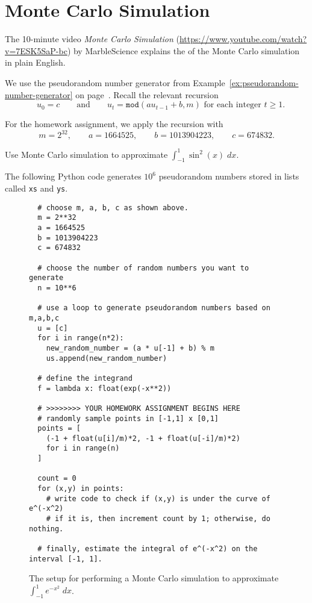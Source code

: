 \documentclass[../main.tex]{subfiles}
\begin{document}
 \section{Monte Carlo Simulation}\label{sec:probability-monte-carlo}

\faYoutube{} The 10-minute video \emph{Monte Carlo Simulation} (\url{https://www.youtube.com/watch?v=7ESK5SaP-bc}) by MarbleScience explains the  of the Monte Carlo simulation in plain English.

We use the pseudorandom number generator from Example~\ref{ex:pseudorandom-number-generator} on page~\pageref{ex:pseudorandom-number-generator}. Recall the relevant recursion 
\[
  \quad u_{0} = c \qquad\text{and}\qquad u_{t} = \mathtt{mod}(a u_{t-1} + b, m) \text{ for each integer } t \ge 1.
\]

For the homework assignment, we apply the recursion with
\[
  m = 2^{32}, \qquad a = 1664525, \qquad b = 1013904223, \qquad c = 674832.
\]

\begin{example}
  Use Monte Carlo simulation to approximate \(\int_{-1}^{1} \sin^{2}(x) \;dx\).
\end{example}

The following Python code generates \(10^{6}\) pseudorandom numbers stored in lists called \texttt{xs} and \texttt{ys}.

\begin{figure}[H]
  \begin{verbatim}
  # choose m, a, b, c as shown above.
  m = 2**32       
  a = 1664525     
  b = 1013904223  
  c = 674832

  # choose the number of random numbers you want to generate
  n = 10**6

  # use a loop to generate pseudorandom numbers based on m,a,b,c
  u = [c]         
  for i in range(n*2):
    new_random_number = (a * u[-1] + b) % m
    us.append(new_random_number)

  # define the integrand
  f = lambda x: float(exp(-x**2))

  # >>>>>>>> YOUR HOMEWORK ASSIGNMENT BEGINS HERE
  # randomly sample points in [-1,1] x [0,1]
  points = [ 
    (-1 + float(u[i]/m)*2, -1 + float(u[-i]/m)*2) 
    for i in range(n) 
  ]
  
  count = 0
  for (x,y) in points:
    # write code to check if (x,y) is under the curve of e^(-x^2)
    # if it is, then increment count by 1; otherwise, do nothing.

  # finally, estimate the integral of e^(-x^2) on the interval [-1, 1].

  \end{verbatim}
  \caption{The setup for performing a Monte Carlo simulation to approximate \(\int_{-1}^{1} e^{-x^{2}}\;dx\).}
\end{figure}
\end{document}
